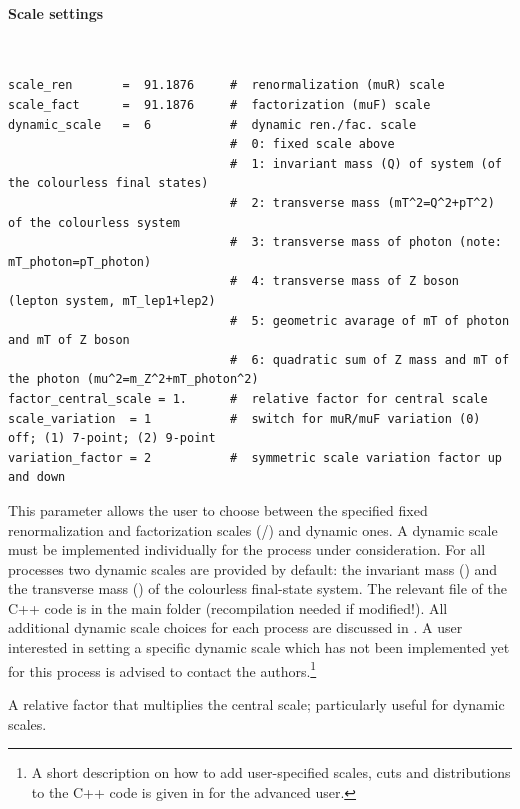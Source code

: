 \documentclass[english,11pt]{article}
\begin{document}
\paragraph{Scale settings}\label{sec:scale}
\lstset{basicstyle=\scriptsize, frame=single}
{\tt
\begin{lstlisting}
scale_ren       =  91.1876     #  renormalization (muR) scale
scale_fact      =  91.1876     #  factorization (muF) scale
dynamic_scale   =  6           #  dynamic ren./fac. scale
                               #  0: fixed scale above
                               #  1: invariant mass (Q) of system (of the colourless final states)
                               #  2: transverse mass (mT^2=Q^2+pT^2) of the colourless system
                               #  3: transverse mass of photon (note: mT_photon=pT_photon)
                               #  4: transverse mass of Z boson (lepton system, mT_lep1+lep2)
                               #  5: geometric avarage of mT of photon and mT of Z boson
                               #  6: quadratic sum of Z mass and mT of the photon (mu^2=m_Z^2+mT_photon^2)
factor_central_scale = 1.      #  relative factor for central scale
scale_variation  = 1           #  switch for muR/muF variation (0) off; (1) 7-point; (2) 9-point
variation_factor = 2           #  symmetric scale variation factor up and down
\end{lstlisting}
}

\quad This parameter allows the user to choose between the specified fixed renormalization and factorization 
scales (/) and dynamic ones. A dynamic scale must be implemented individually for 
the process under consideration. For all processes two dynamic scales are provided by default: the invariant 
mass () and the transverse mass () of the colourless final-state system. 
The relevant file of the C++ code is  in the \Matrix{} main folder 
(recompilation needed if modified!). All additional dynamic scale choices for each process 
are discussed in .
A user interested in setting a specific dynamic scale which has not been implemented yet for this process
is advised to contact the authors.\footnote{A short description on how to
add user-specified scales, cuts and distributions to the C++ code is given in  for the advanced user.}

\quad A relative factor that multiplies the central scale; particularly useful for dynamic scales.
\end{document}

